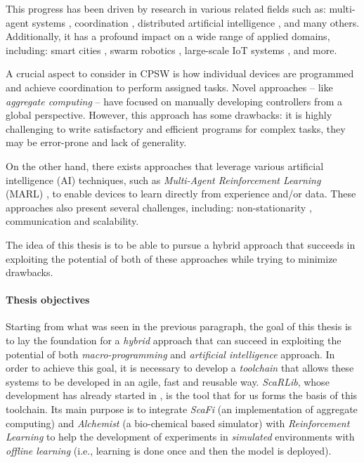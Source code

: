 \documentclass[12pt,a4paper,openright,twoside]{book}
\begin{document}
This progress has been driven by research in various related fields such as: multi-agent systems \cite{dorri2018multi},
    coordination \cite{yang2022overview}, distributed artificial intelligence \cite{bond2014readings}, and many others. 
    Additionally, it has a profound impact on a wide range of applied domains, including: smart cities \cite{zedadra2019swarm}, 
    swarm robotics \cite{brambilla2013swarm}, large-scale IoT systems \cite{uslu2023role}, and more.

A crucial aspect to consider in CPSW is how individual devices are programmed and achieve coordination to perform assigned tasks. 
Novel approaches -- like \emph{aggregate computing} \cite{viroli2018field} -- have focused on manually developing
controllers from a global perspective. However, this approach has some drawbacks: it is highly challenging to write satisfactory 
and efficient programs for complex tasks, they may be error-prone and lack of generality.

On the other hand, there exists approaches that leverage various artificial intelligence (AI) techniques, 
such as \emph{Multi-Agent Reinforcement Learning} (MARL) \cite{busoniu2008comprehensive, marlsurvey},
to enable devices to learn directly from experience and/or data. These approaches also present several challenges, including: non-stationarity 
\cite{hernandez2017survey}, communication and scalability.

The idea of this thesis is to be able to pursue a hybrid approach that succeeds in exploiting the potential of both 
    of these approaches while trying to minimize drawbacks.
%
\paragraph{Thesis objectives}

Starting from what was seen in the previous paragraph, the goal of this thesis is to lay the foundation for a \emph{hybrid} approach 
    that can succeed in exploiting the potential of both \emph{macro-programming} and \emph{artificial intelligence} approach.
    In order to achieve this goal, it is necessary to develop a \emph{toolchain} that allows these systems to be developed in an agile,
    fast and reusable way. 
    \emph{ScaRLib}, whose development has already started in \cite{scarlib}, is the tool that for us forms the basis of this toolchain.
    Its main purpose is to integrate \emph{ScaFi} \cite{casadei2022scafi} (an implementation of aggregate computing) 
    and \emph{Alchemist} \cite{pianini2013chemical} (a bio-chemical based simulator) with \emph{Reinforcement Learning} 
    to help the development of experiments in \emph{simulated} environments with \emph{offline learning}
    (i.e., learning is done once and then the model is deployed).
\end{document}
